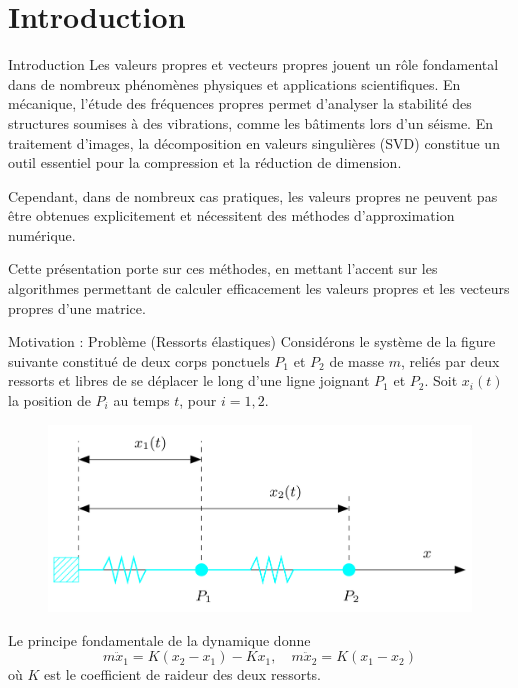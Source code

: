 \documentclass[french, 10pt]{beamer}
\theoremstyle{definition}
\begin{document}
\section[Intro]{Introduction}
\begin{frame}{Introduction}
\justifying
Les valeurs propres et vecteurs propres jouent un rôle fondamental dans de nombreux phénomènes physiques et applications scientifiques.
En mécanique, l’étude des fréquences propres permet d’analyser la stabilité des structures soumises à des vibrations, comme les bâtiments lors d’un séisme.
En traitement d’images, la décomposition en valeurs singulières (SVD) constitue un outil essentiel pour la compression et la réduction de dimension.

Cependant, dans de nombreux cas pratiques, les valeurs propres ne peuvent pas être obtenues explicitement et nécessitent des méthodes d’approximation numérique. 

Cette présentation porte sur ces méthodes, en mettant l’accent sur les algorithmes permettant de calculer efficacement les valeurs propres et les vecteurs propres d’une matrice.
\end{frame}
\begin{frame}{Motivation : Problème (Ressorts élastiques)}
	Considérons le système de la figure suivante constitué de deux corps ponctuels $P_1$ et $P_2$ de masse $m$, reliés par deux ressorts et libres de se déplacer le long d'une ligne joignant $P_1$ et $P_2$. Soit $x_i(t)$ la position de $P_i$ au temps $t$, pour $i=1,2$. 
	\begin{figure}[H]
		\includegraphics[scale=0.27]{pictures/ressort.png}
	\end{figure}
	Le principe fondamentale de la dynamique donne
	$$
	m \ddot{x}_1=K\left(x_2-x_1\right)-K x_1, \quad m \ddot{x}_2=K\left(x_1-x_2\right)
	$$
	où $K$ est le coefficient de raideur des deux ressorts.
\end{frame}
\end{document}

